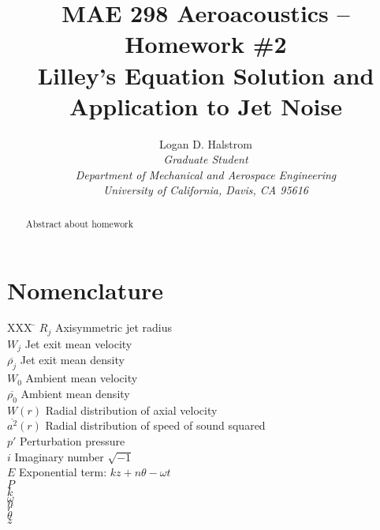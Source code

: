 \documentclass[]{aiaa-tc}%
\title{MAE 298 Aeroacoustics -- Homework \#2 \\ Lilley's Equation Solution and Application to Jet Noise}
\author{
  Logan D. Halstrom \\
  {\normalsize\itshape Graduate Student} \\
  {\normalsize\itshape Department of Mechanical and Aerospace Engineering} \\
  {\normalsize\itshape University of California, Davis, CA 95616}
       }
\begin{document}
\maketitle

\begin{abstract}

Abstract about homework

\end{abstract}

\section*{Nomenclature}

\begin{multicols}{2}

\begin{tabbing}
  XXX \= \kill%
  $R_j$               \> Axisymmetric jet radius \\
  $W_j$               \> Jet exit mean velocity \\
  $\overline{\rho_j}$ \> Jet exit mean density \\
  $W_0$               \> Ambient mean velocity \\
  $\overline{\rho_0}$ \> Ambient mean density \\
  $W(r)$              \> Radial distribution of axial velocity \\
  $\overline{a^2}(r)$ \> Radial distribution of speed of sound squared\\
  $p'$                \> Perturbation pressure \\
  $i$                 \> Imaginary number $\sqrt{-1}$ \\
  $E$                 \> Exponential term: $kz + n\theta -\omega t$ \\
  $P$                 \>  \\
  $k$                 \>  \\
  $\omega$            \>  \\
  $n$                 \>  \\
  $r$                 \>  \\
  $\theta$            \>  \\
  $z$                 \>  \\



\end{tabbing}

\end{multicols}
\end{document}
